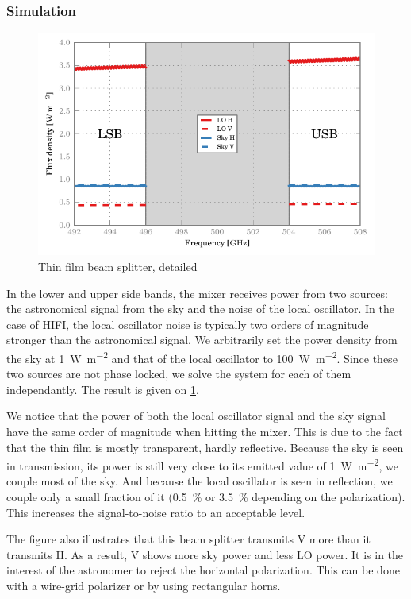 \subsubsection{Simulation}
\begin{figure}[hbtp]
    \centering
    \includegraphics{thin_film_beam_splitter_detailed}
    \caption{Thin film beam splitter, detailed}
    \label{fig:thin_film_beam_splitter_detailed}
\end{figure}
In the lower and upper side bands, the mixer receives power from two sources: the astronomical signal from the sky and the noise of the local oscillator.
In the case of HIFI, the local oscillator noise is typically two orders of magnitude stronger than the astronomical signal.
We arbitrarily set the power density from the sky at \SI{1}{\watt\per\meter\squared} and that of the local oscillator to \SI{100}{\watt\per\meter\squared}.
Since these two sources are not phase locked, we solve the system for each of them independantly.
The result is given on \cref{fig:thin_film_beam_splitter_detailed}.

We notice that the power of both the local oscillator signal and the sky signal have the same order of magnitude when hitting the mixer.
This is due to the fact that the thin film is mostly transparent, hardly reflective.
Because the sky is seen in transmission, its power is still very close to its emitted value of \SI{1}{\watt\per\meter\squared}, we couple most of the sky.
And because the local oscillator is seen in reflection, we couple only a small fraction of it (\SI{0.5}{\percent} or \SI{3.5}{\percent} depending on the polarization).
This increases the signal-to-noise ratio to an acceptable level.

The figure also illustrates that this beam splitter transmits V more than it transmits H.
As a result, V shows more sky power and less LO power.
It is in the interest of the astronomer to reject the horizontal polarization.
This can be done with a wire-grid polarizer or by using rectangular horns.

